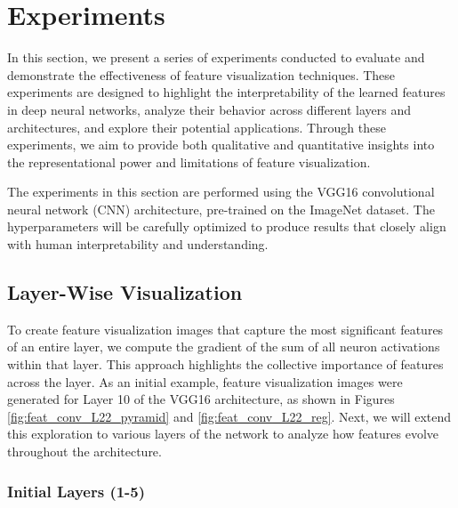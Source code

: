 \section{Experiments}

In this section, we present a series of experiments conducted to evaluate and demonstrate the effectiveness of feature visualization techniques. 
These experiments are designed to highlight the interpretability of the learned features in deep neural networks, analyze their behavior across different layers and architectures, and explore their potential applications. 
Through these experiments, we aim to provide both qualitative and quantitative insights into the representational power and limitations of feature visualization.

The experiments in this section are performed using the VGG16 convolutional neural network (CNN) architecture, pre-trained on the ImageNet dataset. 
The hyperparameters will be carefully optimized to produce results that closely align with human interpretability and understanding.

\subsection{Layer-Wise Visualization}


To create feature visualization images that capture the most significant features of an entire layer, we compute the gradient of the sum of all neuron activations within that layer. 
This approach highlights the collective importance of features across the layer.
As an initial example, feature visualization images were generated for Layer 10 of the VGG16 architecture, as shown in Figures \ref{fig:feat_conv_L22_pyramid} and \ref{fig:feat_conv_L22_reg}.
Next, we will extend this exploration to various layers of the network to analyze how features evolve throughout the architecture.

\subsubsection{Initial Layers (1-5)}


